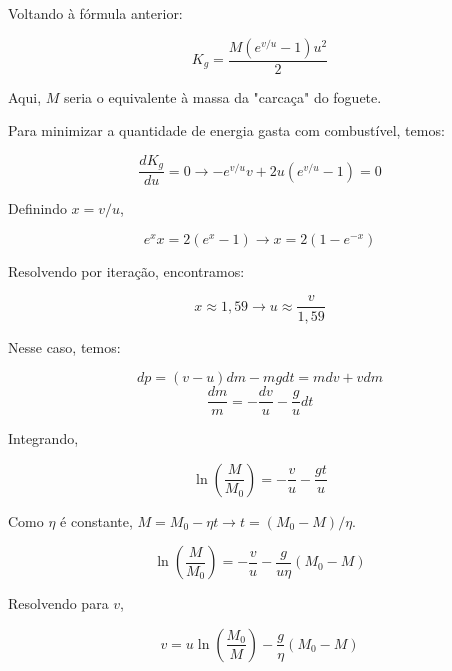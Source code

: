 \documentclass[11pt]{article}
\begin{document}
\begin{pproblem}
\begin{pssolution*}{}{}
\begin{alternativas}
            Voltando à fórmula anterior:
            
            \[K_g = \frac{M(e^{v/u}-1)u^2}{2}\]

            Aqui, \(M\) seria o equivalente à massa da "carcaça" do foguete.

            Para minimizar a quantidade de energia gasta com combustível, temos:

            \[\frac{dK_g}{du}=0  \rightarrow -e^{v/u}v +2u(e^{v/u}-1)=0\]

            Definindo \(x=v/u\),

            \[e^xx = 2(e^x-1) \rightarrow x = 2(1-e^{-x})\]

            Resolvendo por iteração, encontramos:

            \[x \approx 1,59 \rightarrow \boxed{u \approx \frac{v}{1,59}} \]

            \item Nesse caso, temos:
            
            \[dp = (v-u)dm - mgdt = mdv +vdm\]
            \[\frac{dm}{m} = -\frac{dv}{u} - \frac{g}{u}dt\]

            Integrando,

            \[\ln\left(\frac{M}{M_0}\right) = -\frac{v}{u} - \frac{gt}{u}\]

            Como \(\eta\) é constante, \(M = M_0 -\eta t \rightarrow t = (M_0-M)/\eta\).

            \[\ln\left(\frac{M}{M_0}\right) = -\frac{v}{u} - \frac{g}{u\eta}(M_0-M)\]

            Resolvendo para \(v\),

            \[\boxed{v = u\ln\left(\frac{M_0}{M}\right)-\frac{g}{\eta}(M_0-M)}\]
        \end{alternativas}
    \end{pssolution*}
\end{pproblem}  
\end{document}

